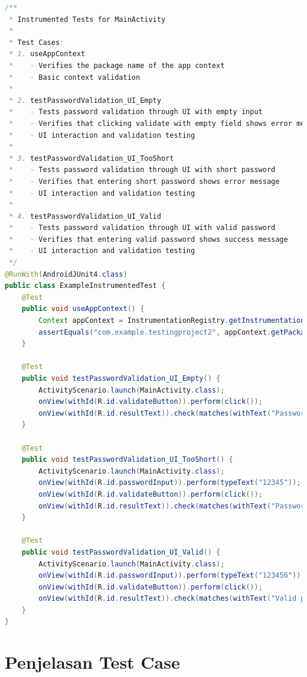 \documentclass[12pt,a4paper]{article}
\begin{document}
\begin{lstlisting}[language=Java, caption=ExampleInstrumentedTest.java]
/**
 * Instrumented Tests for MainActivity
 * 
 * Test Cases:
 * 1. useAppContext
 *    - Verifies the package name of the app context
 *    - Basic context validation
 * 
 * 2. testPasswordValidation_UI_Empty
 *    - Tests password validation through UI with empty input
 *    - Verifies that clicking validate with empty field shows error message
 *    - UI interaction and validation testing
 * 
 * 3. testPasswordValidation_UI_TooShort
 *    - Tests password validation through UI with short password
 *    - Verifies that entering short password shows error message
 *    - UI interaction and validation testing
 * 
 * 4. testPasswordValidation_UI_Valid
 *    - Tests password validation through UI with valid password
 *    - Verifies that entering valid password shows success message
 *    - UI interaction and validation testing
 */
@RunWith(AndroidJUnit4.class)
public class ExampleInstrumentedTest {
    @Test
    public void useAppContext() {
        Context appContext = InstrumentationRegistry.getInstrumentation().getTargetContext();
        assertEquals("com.example.testingproject2", appContext.getPackageName());
    }

    @Test
    public void testPasswordValidation_UI_Empty() {
        ActivityScenario.launch(MainActivity.class);
        onView(withId(R.id.validateButton)).perform(click());
        onView(withId(R.id.resultText)).check(matches(withText("Password cannot be empty")));
    }

    @Test
    public void testPasswordValidation_UI_TooShort() {
        ActivityScenario.launch(MainActivity.class);
        onView(withId(R.id.passwordInput)).perform(typeText("12345"));
        onView(withId(R.id.validateButton)).perform(click());
        onView(withId(R.id.resultText)).check(matches(withText("Password must be at least 6 characters")));
    }

    @Test
    public void testPasswordValidation_UI_Valid() {
        ActivityScenario.launch(MainActivity.class);
        onView(withId(R.id.passwordInput)).perform(typeText("123456"));
        onView(withId(R.id.validateButton)).perform(click());
        onView(withId(R.id.resultText)).check(matches(withText("Valid password")));
    }
}

\end{lstlisting}

\section{Penjelasan Test Case}
\end{document}
